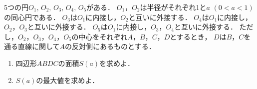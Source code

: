 \documentclass[../../main.tex]{subfiles}
\begin{document}
5つの円$O_1, \, O_2, \, O_3, \, O_4, \, O_5$がある．
$O_1$，$O_2$は半径がそれぞれ1と$a$ $(0<a<1)$の同心円である．
$O_3$は$O_1$に内接し，$O_2$と互いに外接する．
$O_4$は$O_1$に内接し，$O_2$，$O_3$と互いに外接する．
$O_5$は$O_1$に内接し，$O_3$，$O_4$と互いに外接する．
ただし，$O_2$，$O_3$，$O_4$，$O_5$の中心をそれぞれ$A$，$B$，$C$，$D$とするとき，
$D$は$B$，$C$を通る直線に関して$A$の反対側にあるものとする．
\begin{enumerate}
  \item 四辺形$ABDC$の面積$S(a)$を求めよ．
  \item $S(a)$の最大値を求めよ．
\end{enumerate}
\end{document}
